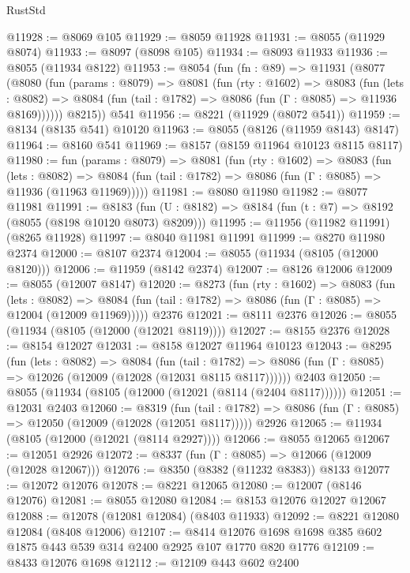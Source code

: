 \begin{lexlean}{RustStd}
\begin{coremodule}
@11928 := @8069 @105
@11929 := @8059 @11928
@11931 := @8055 (@11929 @8074)
@11933 := @8097 (@8098 @105)
@11934 := @8093 @11933
@11936 := @8055 (@11934 @8122)
@11953 := @8054
    (fun (fn : @89) =>
    @11931
      (@8077
        (@8080
          (fun (params : @8079) =>
          @8081
            (fun (rty : @1602) =>
            @8083
              (fun (lets : @8082) =>
              @8084 (fun (tail : @1782) => @8086 (fun (Γ : @8085) => @11936 @8169))))))
        @8215))
    @541
@11956 := @8221 (@11929 (@8072 @541))
@11959 := @8134 (@8135 @541) @10120
@11963 := @8055 (@8126 (@11959 @8143) @8147)
@11964 := @8160 @541
@11969 := @8157 (@8159 @11964 @10123 @8115 @8117)
@11980 := fun (params : @8079) =>
  @8081
    (fun (rty : @1602) =>
    @8083
      (fun (lets : @8082) =>
      @8084 (fun (tail : @1782) => @8086 (fun (Γ : @8085) => @11936 (@11963 @11969)))))
@11981 := @8080 @11980
@11982 := @8077 @11981
@11991 := @8183
    (fun (U : @8182) => @8184 (fun (t : @7) => @8192 (@8055 (@8198 @10120 @8073) @8209)))
@11995 := @11956 (@11982 @11991) (@8265 @11928)
@11997 := @8040 @11981 @11991
@11999 := @8270 @11980 @2374
@12000 := @8107 @2374
@12004 := @8055 (@11934 (@8105 (@12000 @8120)))
@12006 := @11959 (@8142 @2374)
@12007 := @8126 @12006
@12009 := @8055 (@12007 @8147)
@12020 := @8273
    (fun (rty : @1602) =>
    @8083
      (fun (lets : @8082) =>
      @8084 (fun (tail : @1782) => @8086 (fun (Γ : @8085) => @12004 (@12009 @11969)))))
    @2376
@12021 := @8111 @2376
@12026 := @8055 (@11934 (@8105 (@12000 (@12021 @8119))))
@12027 := @8155 @2376
@12028 := @8154 @12027
@12031 := @8158 @12027 @11964 @10123
@12043 := @8295
    (fun (lets : @8082) =>
    @8084
      (fun (tail : @1782) =>
      @8086 (fun (Γ : @8085) => @12026 (@12009 (@12028 (@12031 @8115 @8117))))))
    @2403
@12050 := @8055 (@11934 (@8105 (@12000 (@12021 (@8114 (@2404 @8117))))))
@12051 := @12031 @2403
@12060 := @8319
    (fun (tail : @1782) => @8086 (fun (Γ : @8085) => @12050 (@12009 (@12028 (@12051 @8117)))))
    @2926
@12065 := @11934 (@8105 (@12000 (@12021 (@8114 @2927))))
@12066 := @8055 @12065
@12067 := @12051 @2926
@12072 := @8337 (fun (Γ : @8085) => @12066 (@12009 (@12028 @12067)))
@12076 := @8350 (@8382 (@11232 @8383)) @8133
@12077 := @12072 @12076
@12078 := @8221 @12065
@12080 := @12007 (@8146 @12076)
@12081 := @8055 @12080
@12084 := @8153 @12076 @12027 @12067
@12088 := @12078 (@12081 @12084) (@8403 @11933)
@12092 := @8221 @12080 @12084 (@8408 @12006)
@12107 := @8414 @12076 @1698 @1698 @385 @602 @1875 @443 @539 @314 @2400 @2925 @107 @1770 @820 @1776
@12109 := @8433 @12076 @1698
@12112 := @12109 @443 @602 @2400

\end{coremodule}
\end{lexlean}
